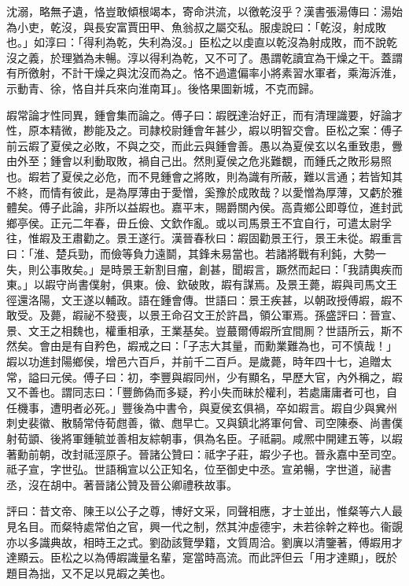 \begin{pinyinscope}
沈溺，略無孑遺，恪豈敢傾根竭本，寄命洪流，以徼乾沒乎？漢書張湯傳曰：湯始為小吏，乾沒，與長安富賈田甲、魚翁叔之屬交私。服虔說曰：「乾沒，射成敗也。」如淳曰：「得利為乾，失利為沒。」臣松之以虔直以乾沒為射成敗，而不說乾沒之義，於理猶為未暢。淳以得利為乾，又不可了。愚謂乾讀宜為干燥之干。蓋謂有所徼射，不計干燥之與沈沒而為之。恪不過遣偏率小將素習水軍者，乘海泝淮，示動青、徐，恪自并兵來向淮南耳」。後恪果圖新城，不克而歸。

嘏常論才性同異，鍾會集而論之。傅子曰：嘏旣達治好正，而有清理識要，好論才性，原本精微，尠能及之。司隷校尉鍾會年甚少，嘏以明智交會。臣松之案：傅子前云嘏了夏侯之必敗，不與之交，而此云與鍾會善。愚以為夏侯玄以名重致患，釁由外至；鍾會以利動取敗，禍自己出。然則夏侯之危兆難覩，而鍾氏之敗形易照也。嘏若了夏侯之必危，而不見鍾會之將敗，則為識有所蔽，難以言通；若皆知其不終，而情有彼此，是為厚薄由于愛憎，奚豫於成敗哉？以愛憎為厚薄，又虧於雅體矣。傅子此論，非所以益嘏也。嘉平末，賜爵關內侯。高貴鄉公即尊位，進封武鄉亭侯。正元二年春，毌丘儉、文欽作亂。或以司馬景王不宜自行，可遣太尉孚往，惟嘏及王肅勸之。景王遂行。漢晉春秋曰：嘏固勸景王行，景王未從。嘏重言曰：「淮、楚兵勁，而儉等負力遠鬬，其鋒未易當也。若諸將戰有利鈍，大勢一失，則公事敗矣。」是時景王新割目瘤，創甚，聞嘏言，蹶然而起曰：「我請輿疾而東。」以嘏守尚書僕射，俱東。儉、欽破敗，嘏有謀焉。及景王薨，嘏與司馬文王徑還洛陽，文王遂以輔政。語在鍾會傳。世語曰：景王疾甚，以朝政授傅嘏，嘏不敢受。及薨，嘏祕不發喪，以景王命召文王於許昌，領公軍焉。孫盛評曰：晉宣、景、文王之相魏也，權重相承，王業基矣。豈蕞爾傅嘏所宜間厠？世語所云，斯不然矣。會由是有自矜色，嘏戒之曰：「子志大其量，而勳業難為也，可不慎哉！」嘏以功進封陽鄉侯，增邑六百戶，并前千二百戶。是歲薨，時年四十七，追贈太常，謚曰元侯。傅子曰：初，李豐與嘏同州，少有顯名，早歷大官，內外稱之，嘏又不善也。謂同志曰：「豐飾偽而多疑，矜小失而昧於權利，若處庸庸者可也，自任機事，遭明者必死。」豐後為中書令，與夏侯玄俱禍，卒如嘏言。嘏自少與兾州刺史裴徽、散騎常侍荀甝善，徽、甝早亡。又與鎮北將軍何曾、司空陳泰、尚書僕射荀顗、後將軍鍾毓並善相友綜朝事，俱為名臣。子祗嗣。咸熈中開建五等，以嘏著勳前朝，改封祗涇原子。晉諸公贊曰：祗字子莊，嘏少子也。晉永嘉中至司空。祗子宣，字世弘。世語稱宣以公正知名，位至御史中丞。宣弟暢，字世道，祕書丞，沒在胡中。著晉諸公贊及晉公卿禮秩故事。

評曰：昔文帝、陳王以公子之尊，博好文采，同聲相應，才士並出，惟粲等六人最見名目。而粲特處常伯之官，興一代之制，然其沖虛德宇，未若徐幹之粹也。衞覬亦以多識典故，相時王之式。劉劭該覽學籍，文質周洽。劉廙以清鑒著，傅嘏用才達顯云。臣松之以為傅嘏識量名輩，寔當時高流。而此評但云「用才達顯」，旣於題目為拙，又不足以見嘏之美也。


\end{pinyinscope}